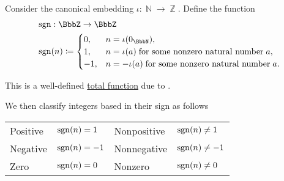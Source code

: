 \begin{definition}\label{def:integer_signum}
  Consider the canonical embedding \( \iota: \BbbN \to \BbbZ \). Define the  function
  \begin{equation*}
    \begin{aligned}
      &\sgn: \BbbZ \to \BbbZ \\
      &\sgn(n) \coloneqq \begin{cases}
        0,  &n = \iota(0_\BbbN), \\
        1,  &n = \iota(a) \T{for some nonzero natural number} a, \\
        -1, &n = -\iota(a) \T{for some nonzero natural number} a.
      \end{cases}
    \end{aligned}
  \end{equation*}

  This is a well-defined \hyperref[def:multi_valued_function/total]{total function} due to .

  We then classify integers based in their sign as follows
  \begin{center}
    \begin{tabular}{l | l || l | l}
      Positive    & \( \operatorname{sgn}(n) = 1 \)  & Nonpositive & \( \operatorname{sgn}(n) \neq 1 \) \\
      Negative    & \( \operatorname{sgn}(n) = -1 \) & Nonnegative & \( \operatorname{sgn}(n) \neq -1 \) \\
      Zero        & \( \operatorname{sgn}(n) = 0 \)  & Nonzero     & \( \operatorname{sgn}(n) \neq 0 \) \\
    \end{tabular}
  \end{center}
\end{definition}


